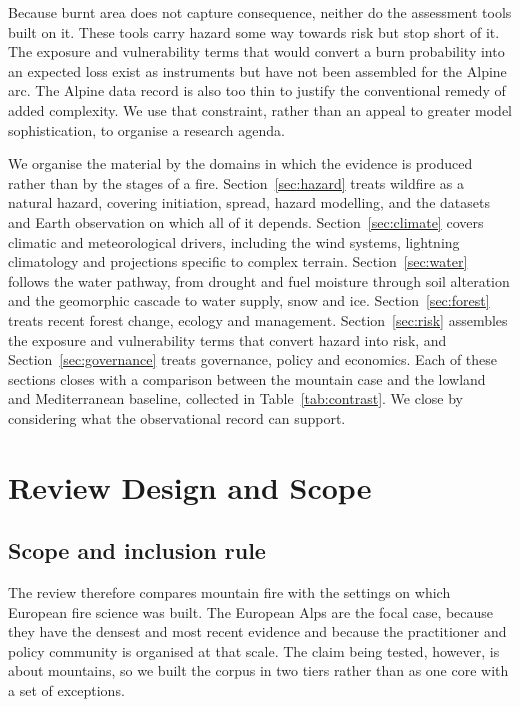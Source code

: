 \documentclass[11pt,a4paper]{article}
\begin{document}
Because burnt area does not capture consequence, neither do the assessment tools built on it. These tools carry hazard some way towards risk but stop short of it. The exposure and vulnerability terms that would convert a burn probability into an expected loss exist as instruments but have not been assembled for the Alpine arc. The Alpine data record is also too thin to justify the conventional remedy of added complexity. We use that constraint, rather than an appeal to greater model sophistication, to organise a research agenda.

We organise the material by the domains in which the evidence is produced rather than by the stages of a fire. Section~\ref{sec:hazard} treats wildfire as a natural hazard, covering initiation, spread, hazard modelling, and the datasets and Earth observation on which all of it depends. Section~\ref{sec:climate} covers climatic and meteorological drivers, including the wind systems, lightning climatology and projections specific to complex terrain. Section~\ref{sec:water} follows the water pathway, from drought and fuel moisture through soil alteration and the geomorphic cascade to water supply, snow and ice. Section~\ref{sec:forest} treats recent forest change, ecology and management. Section~\ref{sec:risk} assembles the exposure and vulnerability terms that convert hazard into risk, and Section~\ref{sec:governance} treats governance, policy and economics. Each of these sections closes with a comparison between the mountain case and the lowland and Mediterranean baseline, collected in Table~\ref{tab:contrast}. We close by considering what the observational record can support.

\section{Review Design and Scope}
\label{sec:scope}

\subsection{Scope and inclusion rule}

The review therefore compares mountain fire with the settings on which European fire science was built. The European Alps are the focal case, because they have the densest and most recent evidence and because the practitioner and policy community is organised at that scale. The claim being tested, however, is about mountains, so we built the corpus in two tiers rather than as one core with a set of exceptions.
\end{document}
